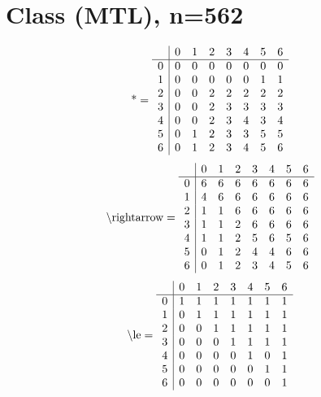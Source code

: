 \documentclass[11pt]{article}
\begin{document}
\section{Class (MTL), n=562}
\[\text{*} = 
\begin{array}{r | r r r r r r r}
 & 0 & 1 & 2 & 3 & 4 & 5 & 6 \\ \hline
0 & 0 & 0 & 0 & 0 & 0 & 0 & 0 \\
1 & 0 & 0 & 0 & 0 & 0 & 1 & 1 \\
2 & 0 & 0 & 2 & 2 & 2 & 2 & 2 \\
3 & 0 & 0 & 2 & 3 & 3 & 3 & 3 \\
4 & 0 & 0 & 2 & 3 & 4 & 3 & 4 \\
5 & 0 & 1 & 2 & 3 & 3 & 5 & 5 \\
6 & 0 & 1 & 2 & 3 & 4 & 5 & 6 \\
\end{array}
\]
\[\text{\textbackslash rightarrow} = 
\begin{array}{r | r r r r r r r}
 & 0 & 1 & 2 & 3 & 4 & 5 & 6 \\ \hline
0 & 6 & 6 & 6 & 6 & 6 & 6 & 6 \\
1 & 4 & 6 & 6 & 6 & 6 & 6 & 6 \\
2 & 1 & 1 & 6 & 6 & 6 & 6 & 6 \\
3 & 1 & 1 & 2 & 6 & 6 & 6 & 6 \\
4 & 1 & 1 & 2 & 5 & 6 & 5 & 6 \\
5 & 0 & 1 & 2 & 4 & 4 & 6 & 6 \\
6 & 0 & 1 & 2 & 3 & 4 & 5 & 6 \\
\end{array}
\]
\[\text{\textbackslash le} = 
\begin{array}{r | r r r r r r r}
 & 0 & 1 & 2 & 3 & 4 & 5 & 6 \\ \hline
0 & 1 & 1 & 1 & 1 & 1 & 1 & 1 \\
1 & 0 & 1 & 1 & 1 & 1 & 1 & 1 \\
2 & 0 & 0 & 1 & 1 & 1 & 1 & 1 \\
3 & 0 & 0 & 0 & 1 & 1 & 1 & 1 \\
4 & 0 & 0 & 0 & 0 & 1 & 0 & 1 \\
5 & 0 & 0 & 0 & 0 & 0 & 1 & 1 \\
6 & 0 & 0 & 0 & 0 & 0 & 0 & 1 \\
\end{array}
\]
\end{document}
